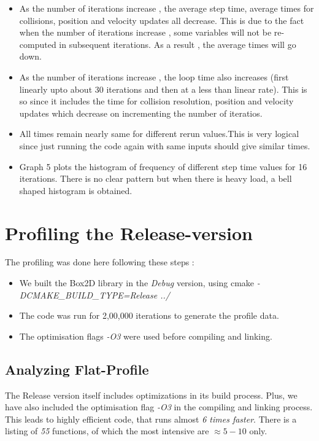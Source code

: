 \documentclass[a4paper,11pt]{article}
\begin{document}
\begin{itemize}
\item As the number of iterations increase , the average step time, average times for collisions, position and velocity updates all decrease. This is due to the fact when the number of iterations increase , some variables will not be re-computed in subsequent iterations.
As a result , the average times will go down.
\item As the number of iterations increase , the loop time also increases (first linearly upto about 30 iterations and then at a less than linear rate). This is so since it includes the time for collision resolution, position and velocity updates which decrease on incrementing the number of iteratios.
\item All times remain nearly same for different rerun values.This is very logical since just running the code again with same inputs should give similar times.
\item Graph 5 plots the histogram of frequency of different step time values for 16 iterations. There is no clear pattern but when there is heavy load, a bell shaped histogram is obtained.
\end{itemize}

\section{Profiling the Release-version}

The profiling was done here following these steps :

\begin{itemize}

\item We built the Box2D library in the \emph{Debug} version, using cmake \emph{-DCMAKE\_BUILD\_TYPE=Release ../}
\item The code was run for 2,00,000 iterations to generate the profile data. 
\item The optimisation flags \emph{-O3} were used before compiling and linking.

\end{itemize}

\subsection{Analyzing Flat-Profile}

The Release version itself includes optimizations in its build process. Plus, we have also included the optimisation flag \emph{-O3} in the compiling and linking process. This leads to highly efficient code, that runs almost \emph{6 times faster}. There is a listing of \emph{55} functions, of which the most intensive are $\approx 5-10$ only. 
\end{document}
